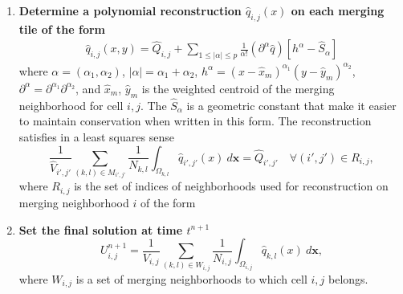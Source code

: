 \begin{enumerate}
\item \textbf{Determine a polynomial reconstruction $\hat q_{i,j}(x)$ on 
each merging tile of the form}
\begin{equation}\label{eq:q}
\begin{aligned}
    \hat q_{i,j} (x,y) = \widehat{Q}_{i,j} +  \sum_{1 \leq |\alpha| \leq p}  \frac{1}{\alpha!} (\partial^{\alpha} \hat q) [h^{\alpha}-\hat S_{\alpha}]
\end{aligned}
\end{equation}
where $\alpha = (\alpha_1, \alpha_2)$, $|\alpha| = \alpha_1 + \alpha_2$, $h^{\alpha} = (x-\hat x_m)^{\alpha_1}(y-\hat y_m)^{\alpha_2}$, $\partial^{\alpha} = \partial^{\alpha_1}\partial^{\alpha_2}$,
and $\hat x_m$, $\hat y_m$ is the weighted centroid of the merging
neighborhood for cell $i,j$. 
The $ \hat S_{\alpha}$ is a geometric
constant that make it easier to maintain conservation when written in
this form.  The reconstruction satisfies in a least squares sense
\begin{equation}\label{eq:qi}
\frac{1}{\hat{V}_{i',j'}}\sum_{(k,l) \in M_{i',j'}}\frac{1}{N_{k,l}}\int_{\Omega_{k,l}} \hat q_{i',j'}(x)~d\mathbf{x} = \hat Q_{i',j'} \quad \forall (i',j') \in R_{i,j},
\end{equation}
where $R_{i,j}$ is the set of indices of neighborhoods used for reconstruction 
on merging neighborhood $i$ of the form


\item \textbf{Set the final solution at time $t^{n+1}$}
	\begin{equation}\label{eq:final_update}
	U^{n+1}_{i,j} =  \frac{1}{V_{i,j}}\sum_{(k,l) \in W_{i,j}}\frac{1}{N_{i,j}}\int_{\Omega_{i,j}} \hat q_{k,l}(x)~d\mathbf{x} ,
	\end{equation}
	where $W_{i,j}$ is a set of merging neighborhoods to which cell $i,j$ belongs.
\end{enumerate}


